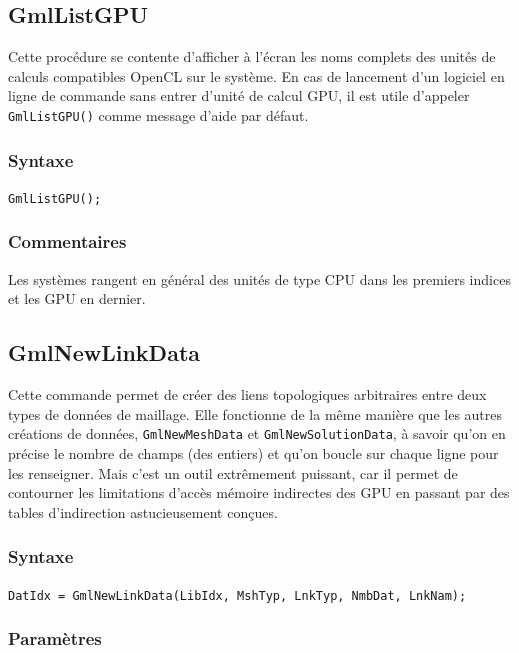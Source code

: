 \documentclass[a4paper,12pt]{article}
\begin{document}
\subsection{GmlListGPU}

Cette procédure se contente d'afficher à l'écran les noms complets des unités de calculs compatibles OpenCL sur le système.
En cas de lancement d'un logiciel en ligne de commande sans entrer d'unité de calcul GPU, il est utile d'appeler {\tt GmlListGPU()} comme message d'aide par défaut.

\subsubsection*{Syntaxe}

{\tt GmlListGPU();}

\subsubsection*{Commentaires}
Les systèmes rangent en général des unités de type CPU dans les premiers indices et les GPU en dernier.


\subsection{GmlNewLinkData}

Cette commande permet de créer des liens topologiques arbitraires entre deux types de données de maillage.
Elle fonctionne de la même manière que les autres créations de données, {\tt GmlNewMeshData} et {\tt GmlNewSolutionData}, à savoir qu'on en précise le nombre de champs (des entiers) et qu'on boucle sur chaque ligne pour les renseigner.
Mais c'est un outil extrêmement puissant, car il permet de contourner les limitations d'accès mémoire indirectes des GPU en passant par des tables d'indirection astucieusement conçues.

\subsubsection*{Syntaxe}

{\tt DatIdx = GmlNewLinkData(LibIdx, MshTyp, LnkTyp, NmbDat, LnkNam);}

\subsubsection*{Paramètres}
\end{document}
